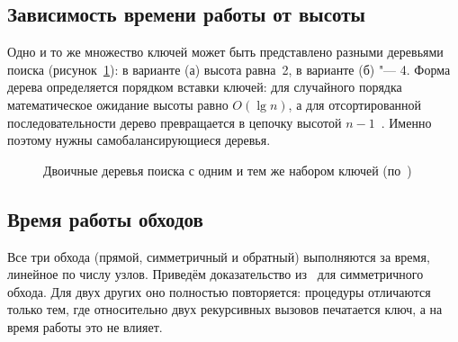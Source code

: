\documentclass[otchet]{SCWorks}
\begin{document}
\subsection{Зависимость времени работы от высоты}
 
Одно и то же множество ключей может быть представлено разными деревьями
поиска (рисунок~\ref{fig:bst-example}): в варианте (а) высота равна~2, в
варианте (б) "--- 4. Форма дерева определяется порядком вставки ключей:
для случайного порядка математическое ожидание высоты равно $O(\lg n)$, а
для отсортированной последовательности дерево превращается в цепочку высотой
$n-1$~\cite{kormen}. Именно поэтому нужны самобалансирующиеся деревья.
 
\begin{figure}[htbp]
  \centering
  \caption{Двоичные деревья поиска с одним и тем же набором ключей (по~\cite{kormen})}
  \label{fig:bst-example}
\end{figure}

\subsection{Время работы обходов}
\label{sec:walk-time}
 
Все три обхода (прямой, симметричный и обратный) выполняются за время,
линейное по числу узлов. Приведём доказательство из~\cite{kormen} для
симметричного обхода. Для двух других оно полностью повторяется: процедуры
отличаются только тем, где относительно двух рекурсивных вызовов
печатается ключ, а на время работы это не влияет.
 
\end{document}
